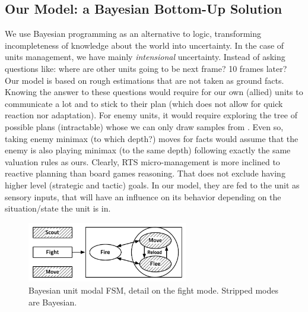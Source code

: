 \subsection{Our Model: a Bayesian Bottom-Up Solution}

We use Bayesian programming as an alternative to logic, transforming incompleteness of knowledge about the world into uncertainty. In the case of units management, we have mainly \textit{intensional} uncertainty. Instead of asking questions like: where are other units going to be next frame? 10 frames later? Our model is based on rough estimations that are not taken as ground facts. Knowing the answer to these questions would require for our own (allied) units to communicate a lot and to stick to their plan (which does not allow for quick reaction nor adaptation). For enemy units, it would require exploring the tree of possible plans (intractable) whose we can only draw samples from \citep{UCT}. Even so, taking enemy minimax (to which depth?) moves for facts would assume that the enemy is also playing minimax (to the same depth) following exactly the same valuation rules as ours. Clearly, RTS micro-management is more inclined to reactive planning than board games reasoning. That does not exclude having higher level (strategic and tactic) goals. In our model, they are fed to the unit as sensory inputs, that will have an influence on its behavior depending on the situation/state the unit is in.

\begin{figure}[!ht]
\begin{center}
\includegraphics[width=7cm]{images/unit_HFSM.pdf}
\end{center}
\label{fig:unit_HFSM}
\caption{Bayesian unit modal FSM, detail on the fight mode. Stripped modes are Bayesian.}
\end{figure}

